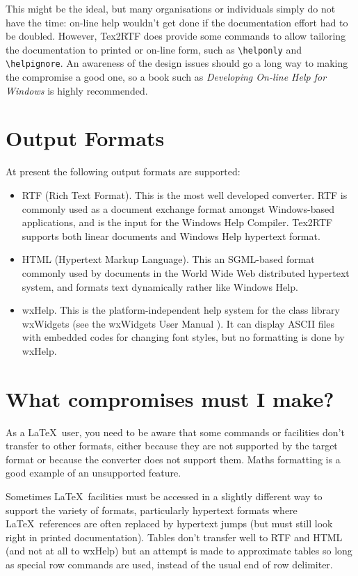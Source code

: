 This might be the ideal, but many organisations or individuals simply
do not have the time: on-line help wouldn't get done if the
documentation effort had to be doubled. However, Tex2RTF does provide
some commands to allow tailoring the documentation to printed or
on-line form, such as \verb$\helponly$ and \verb$\helpignore$. An awareness
of the design issues should go a long way to making the compromise
a good one, so a book such as {\it Developing On-line Help for Windows} \cite{helpbook} is highly recommended.

\section{Output Formats}%

At present the following output formats are supported:

\begin{itemize}
\itemsep=0pt
\item RTF (Rich Text Format). This is the most well developed
converter. RTF is commonly used as a document exchange format amongst
Windows-based applications, and is the input for the Windows Help
Compiler. Tex2RTF supports both linear documents and Windows Help
hypertext format.
\item HTML (Hypertext Markup Language). This an SGML-based format
commonly used by documents in the World Wide Web distributed hypertext
system, and formats text dynamically rather like Windows Help.
\item wxHelp. This is the platform-independent help system for
the class library wxWidgets (see the wxWidgets User Manual \cite{smart93a}).
It can display ASCII files with embedded codes
for changing font styles, but no formatting is done by wxHelp.
\end{itemize}

\section{What compromises must I make?}%

As a \LaTeX\ user, you need to be aware that some commands or facilities
don't transfer to other formats, either because they are not supported
by the target format or because the converter does not support them. 
Maths formatting is a good example of an unsupported feature.

Sometimes \LaTeX\ facilities must be accessed in a slightly different
way to support the variety of formats, particularly hypertext formats
where \LaTeX\ references are often replaced by hypertext jumps (but must
still look right in printed documentation). Tables don't transfer well
to RTF and HTML (and not at all to wxHelp) but an attempt is made
to approximate tables so long as special row commands are used, instead
of the usual end of row delimiter.


